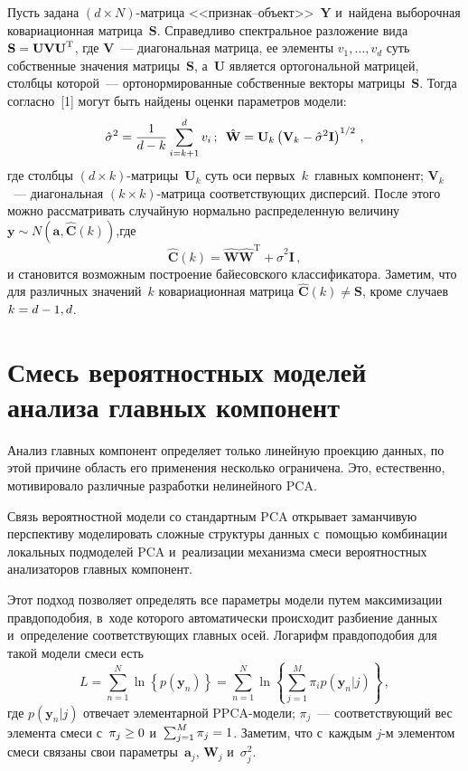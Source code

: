 \begin{multicols}{2}
     Пусть задана $(d\times N)$-мат\-ри\-ца  
<<при\-знак--объ\-ект>>~$\mathbf{Y}$ и~найдена выборочная ковариационная 
мат\-ри\-ца~$\mathbf{S}$. Справедливо спектральное разложение вида 
$\mathbf{S}\hm= \mathbf{UVU}^{\mathrm{T}}$, где $\mathbf{V}$~--- 
диагональная матрица, ее элементы $v_1,\ldots , v_d$ суть собственные 
значения матрицы~$\mathbf{S}$, а~$\mathbf{U}$ является ортогональной 
матрицей, столбцы которой~--- ортонормированные собственные векторы  
мат\-ри\-цы~$\mathbf{S}$. Тогда согласно~[1] могут быть найдены оценки 
параметров модели:
     $$
     \hat{\sigma}^2=\displaystyle\frac{\displaystyle 1\mathstrut}{\displaystyle d-k\mathstrut}\sum\limits^d_{i=k+1} v_i\,;\enskip 
\hat{\mathbf{W}}= \mathbf{U}_k\left( \mathbf{V}_k-
\hat{\sigma}^2\mathbf{I}\right)^{1/2}\,,
     $$
где столбцы $(d\times k)$-мат\-ри\-цы~$\mathbf{U}_k$ суть оси 
первых~$k$~главных компонент; $\mathbf{V}_k$~--- диагональная  
$(k\times k)$-мат\-ри\-ца соответствующих дисперсий. После этого можно 
рассматривать случайную нормально распределенную величину 
$\mathbf{y}\sim N(\mathbf{a},\hat{\mathbf{C}}(k))$,\linebreak где
$$
\hat{\mathbf{C}}(k) 
=\hat{\mathbf{W}}\hat{\mathbf{W}}^{\mathrm{T}}+\hat{\sigma}^2\mathbf{I}\,,
$$
и становится возможным построение байесовского классификатора. 
Заметим, что
для различных значений~$k$ ковариационная матрица 
$\hat{\mathbf{C}}(k)\not=\mathbf{S}$, кроме случаев $k\hm= d\hm- 1,d$.

\section{Смесь вероятностных моделей анализа главных компонент}

     Анализ главных компонент 
     определяет только линейную проекцию данных, по этой причине 
область его применения несколько ограничена. Это, естественно, мотивировало 
различные разработки нелинейного PCA. 

Связь вероятностной модели со 
стандартным PCA открывает заманчивую перспективу моделировать сложные 
структуры данных с~по\-мощью комбинации локальных подмоделей PCA 
и~реализации механизма смеси вероятностных анализаторов главных 
компонент. 

Этот подход позволяет определять все параметры модели путем 
максимизации правдоподобия, в~ходе которого автоматически происходит 
раз\-би\-ение данных и~определение соответствующих главных осей. Логарифм 
правдоподобия для такой модели смеси есть
     $$
     L=\sum\limits^N_{n=1} \ln \left\{ p\left( \mathbf{y}_n\right)\right\} 
=\sum\limits^N_{n=1}\ln \left\{ \sum\limits^M_{j=1} \pi_i p(\mathbf{y}_n\vert 
j)\right\}\,,
     $$
где $p(\mathbf{y}_n\vert j)$ отвечает элементарной PPCA-мо\-де\-ли;  
$\pi_j$~--- соответствующий вес элемента смеси с~$\pi_j\hm\geq 0$ 
и~$\sum\nolimits^M_{j=1} \pi_j\hm=1$. Заметим, что с~каждым $j$-м элементом 
смеси связаны свои параметры~$\mathbf{a}_j$, $\mathbf{W}_j$ и~$\sigma_j^2$.


\end{multicols}
